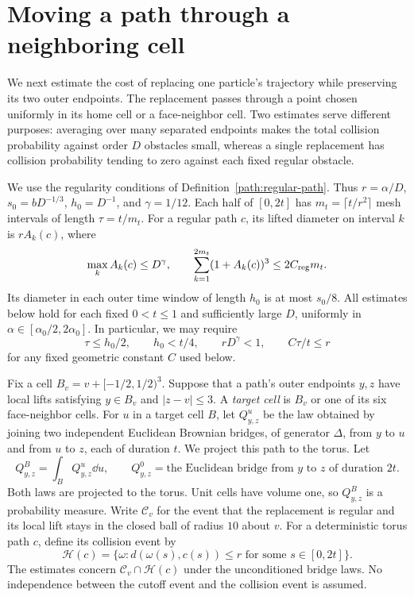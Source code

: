 \section{Moving a path through a neighboring cell}
\label{bridge:section}

We next estimate the cost of replacing one particle's trajectory while
preserving its two outer endpoints.  The replacement passes through a point
chosen uniformly in its home cell or a face-neighbor cell.  Two estimates
serve different purposes: averaging over many separated endpoints makes the
total collision probability against order $D$ obstacles small, whereas a
single replacement has collision probability tending to zero against each
fixed regular obstacle.

We use the regularity conditions of Definition~\ref{path:regular-path}.
Thus $r=\alpha/D$, $s_0=bD^{-1/3}$, $h_0=D^{-1}$, and $\gamma=1/12$.
Each half of $[0,2t]$ has $m_t=\lceil t/r^2\rceil$ mesh intervals of length
$\tau=t/m_t$.  For a regular path $c$, its lifted diameter on interval $k$
is $rA_k(c)$, where
\begin{equation}\label{bridge:oscillations}
 \max_k A_k(c)\le D^\gamma,
 \qquad
 \sum_{k=1}^{2m_t}(1+A_k(c))^3\le 2C_{\rm reg}m_t.
\end{equation}
Its diameter in each outer time window of length $h_0$ is at most $s_0/8$.
All estimates below hold for each fixed $0<t\le1$ and sufficiently large
$D$, uniformly in $\alpha\in[\alpha_0/2,2\alpha_0]$.  In particular, we
may require
\begin{equation}\label{bridge:scale-restrictions}
 \tau\le h_0/2,\qquad h_0<t/4,\qquad rD^\gamma<1,
 \qquad C\tau/t\le r
\end{equation}
for any fixed geometric constant $C$ used below.

Fix a cell $B_v=v+[-1/2,1/2)^3$.  Suppose that a path's outer endpoints
$y,z$ have local lifts satisfying $y\in B_v$ and $|z-v|\le3$.  A
\emph{target cell} is $B_v$ or one of its six face-neighbor cells.  For
$u$ in a target cell $B$, let $Q_{y,z}^u$ be the law obtained by joining two
independent Euclidean Brownian bridges, of generator $\Delta$, from $y$
to $u$ and from $u$ to $z$, each of duration $t$.  We project this path to
the torus.  Let
\[
 Q_{y,z}^{B}=\int_B Q_{y,z}^u\dd u,
 \qquad
 Q_{y,z}^{0}=\text{the Euclidean bridge from $y$ to $z$ of duration $2t$}.
\]
Both laws are projected to the torus.  Unit cells have volume one, so
$Q_{y,z}^{B}$ is a probability measure.
Write $\mathcal C_v$ for the event that the replacement is regular and
its local lift stays in the closed ball of radius $10$ about $v$.
For a deterministic torus path $c$, define its collision event by
\[
 \mathcal H(c)=
 \{\omega: d(\omega(s),c(s))\le r\text{ for some }s\in[0,2t]\}.
\]
The estimates concern $\mathcal C_v\cap\mathcal H(c)$ under the
unconditioned bridge laws.  No independence between the cutoff event and
the collision event is assumed.

